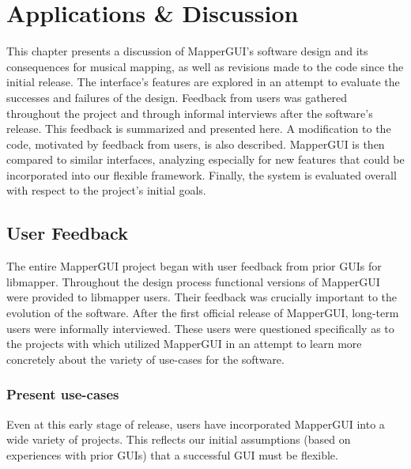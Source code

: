 \chapter{Applications \& Discussion}

This chapter presents a discussion of MapperGUI's software design and its consequences for musical mapping, as well as revisions made to the code since the initial release. The interface's features are explored in an attempt to evaluate the successes and failures of the design. Feedback from users was gathered throughout the project and through informal interviews after the software's release. This feedback is summarized and presented here. A modification to the code, motivated by feedback from users, is also described. MapperGUI is then compared to similar interfaces, analyzing especially for new features that could be incorporated into our flexible framework. Finally, the system is evaluated overall with respect to the project's initial goals.


\section{User Feedback} %
\label{sec:user_feedback}

The entire MapperGUI project began with user feedback from prior GUIs for libmapper. Throughout the design process functional versions of MapperGUI were provided to libmapper users. Their feedback was crucially important to the evolution of the software. After the first official release of MapperGUI, long-term users were informally interviewed. These users were questioned specifically as to the projects with which utilized MapperGUI in an attempt to learn more concretely about the variety of use-cases for the software.

	\subsection{Present use-cases} %
	\label{sub:present_use_cases}

Even at this early stage of release, users have incorporated MapperGUI into a wide variety of projects. This reflects our initial assumptions (based on experiences with prior GUIs) that a successful GUI must be flexible.

